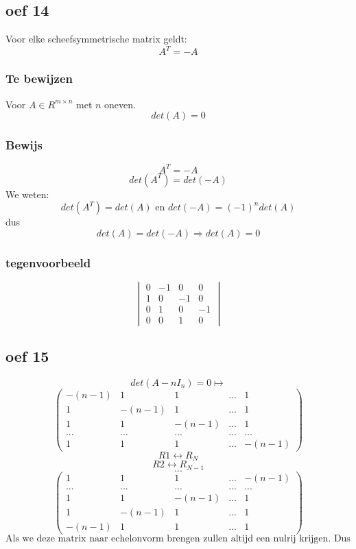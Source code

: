 \documentclass[lineaire_algebra_oplossingen.tex]{subfiles}
\begin{document}
\subsection{oef 14}
Voor elke scheefsymmetrische matrix geldt:
\[
A^T= -A
\]
\subsubsection*{Te bewijzen}
Voor $A\in R^{m\times n}$ met $n$ oneven.
\[
det(A) = 0
\]
\subsubsection*{Bewijs}
\[
A^T = -A
\]
\[
det(A^T) = det(-A)
\]
We weten:
\[
det(A^T) = det(A) \text{ en } det(-A) = (-1)^n det(A)
\]
dus
\[
det(A) = det(-A) \Rightarrow det(A) = 0
\]

\subsubsection*{tegenvoorbeeld}
\[
\begin{vmatrix}
0 & -1 & 0 & 0\\
1 & 0 & -1 & 0\\
0 & 1 & 0 & -1\\
0 & 0 & 1 & 0
\end{vmatrix}
\]
\subsection{oef 15}
\[ det(A-nI_{n})=0 \longmapsto \]
\[
\begin{pmatrix}
-(n-1) & 1 & 1 &... & 1\\
1 & -(n-1) & 1 & ... & 1\\
1 & 1 & -(n-1) & ... & 1\\
... & ... & ... & ... & ...\\
1 & 1 & 1 & ... & -(n-1)
\end{pmatrix} 
\]
\[R1 \leftrightarrow R_{N} \]
\[R2 \leftrightarrow R_{N-1} \]
\[...\]
\[
\begin{pmatrix}
1 & 1 & 1 & ... & -(n-1)\\
... & ... & ... & ... & ...\\
1 & 1 & -(n-1) & ... & 1\\
1 & -(n-1) & 1 & ... & 1\\
-(n-1) & 1 & 1 &... & 1
\end{pmatrix} 
\]
\[ \text{Als we deze matrix naar echelonvorm brengen zullen altijd een nulrij krijgen. Dus det=0}\]
\end{document}
